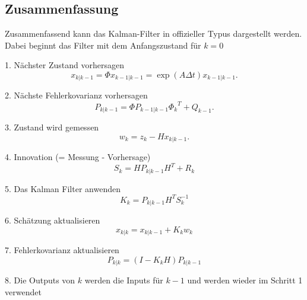 \subsection{Zusammenfassung }
Zusammenfassend kann das Kalman-Filter in offizieller Typus dargestellt werden. 
Dabei beginnt das Filter mit dem Anfangszustand für $k=0$

1. Nächster Zustand vorhersagen
\[
{x_{k|k-1}}=\Phi{x_{k-1|k-1}}= \exp(A\Delta t){x_{k-1|k-1}}.
\] 

2. Nächste Fehlerkovarianz vorhersagen
\[
{P_{k|k-1}}=\Phi {P_{k-1|k-1}} {\Phi _{k}}^T + {Q_{k-1}}.
\] 

3. Zustand wird gemessen
\[
{w_{k}}={z_{k}}-{H}{x_{k|k-1}}.
\] 

4. Innovation (= Messung -  Vorhersage)
\[ 
{S_{k}}={H}{P_{k|k-1}}{H}^T+{R_{k}}
\] 

5. Das Kalman Filter anwenden
\[
{K_{k}}= {P_{k|k-1}} {H^T}{S_{k}^{-1}}
\] 

6. Schätzung aktualisieren
\[
{x_{k|k}}={x_{k|k-1}}+{K_{k}}{w_{k}}
\] 

7. Fehlerkovarianz aktualisieren
\[
{P_{k|k}}=(I-{K_{k}}{H}){P_{k|k-1}}
\] 

8. Die Outputs von $k$ werden die Inputs für ${k-1}$ und werden wieder im Schritt 1 verwendet

